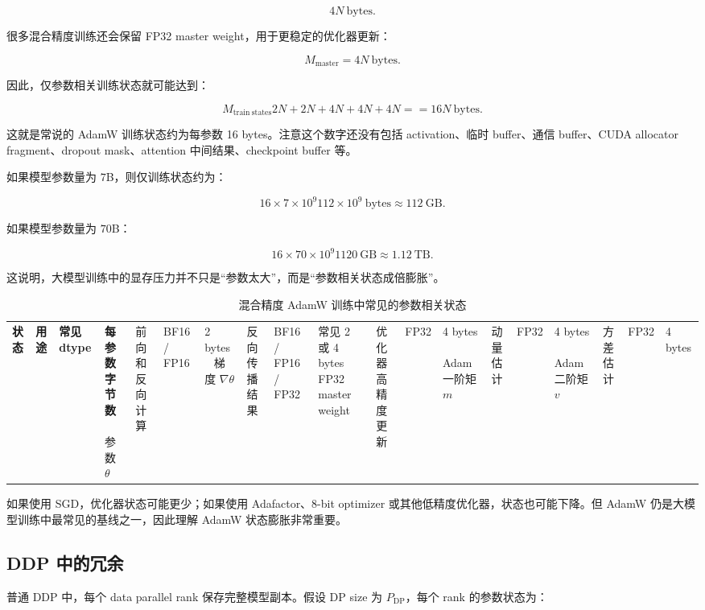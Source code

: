 \[
4N\ \mathrm{bytes}.
\]

很多混合精度训练还会保留 FP32 master weight，用于更稳定的优化器更新：

\[
M_{\mathrm{master}}=4N\ \mathrm{bytes}.
\]

因此，仅参数相关训练状态就可能达到：

\[
M_{\mathrm{train\ states}}
2N
+
2N
+
4N
+
4N
+
4N
==
16N\ \mathrm{bytes}.
\]

这就是常说的 AdamW 训练状态约为每参数 16 bytes。注意这个数字还没有包括 activation、临时 buffer、通信 buffer、CUDA allocator fragment、dropout mask、attention 中间结果、checkpoint buffer 等。

如果模型参数量为 $7$B，则仅训练状态约为：

\[
16\times 7\times 10^9
112\times 10^9\ \mathrm{bytes}
\approx 112\ \mathrm{GB}.
\]

如果模型参数量为 $70$B：

\[
16\times 70\times 10^9
1120\ \mathrm{GB}
\approx 1.12\ \mathrm{TB}.
\]

这说明，大模型训练中的显存压力并不只是“参数太大”，而是“参数相关状态成倍膨胀”。

\begin{table}[H]
\centering
\small
\caption{混合精度 AdamW 训练中常见的参数相关状态}
\label{tab:adamw-state-memory}
\begin{tabular}{p{}p{}p{}p{}}
\toprule
\textbf{状态} & \textbf{用途} & \textbf{常见 dtype} & \textbf{每参数字节数} \
\midrule
参数 $\theta$
& 前向和反向计算
& BF16 / FP16
& 2 bytes \
\midrule
梯度 $\nabla\theta$
& 反向传播结果
& BF16 / FP16 / FP32
& 常见 2 或 4 bytes \
\midrule
FP32 master weight
& 优化器高精度更新
& FP32
& 4 bytes \
\midrule
Adam 一阶矩 $m$
& 动量估计
& FP32
& 4 bytes \
\midrule
Adam 二阶矩 $v$
& 方差估计
& FP32
& 4 bytes \
\bottomrule
\end{tabular}
\end{table}

如果使用 SGD，优化器状态可能更少；如果使用 Adafactor、8-bit optimizer 或其他低精度优化器，状态也可能下降。但 AdamW 仍是大模型训练中最常见的基线之一，因此理解 AdamW 状态膨胀非常重要。

\subsection{DDP 中的冗余}
\label{subsec:ddp-redundancy}

普通 DDP 中，每个 data parallel rank 保存完整模型副本。假设 DP size 为 $P_{\mathrm{DP}}$，每个 rank 的参数状态为：


